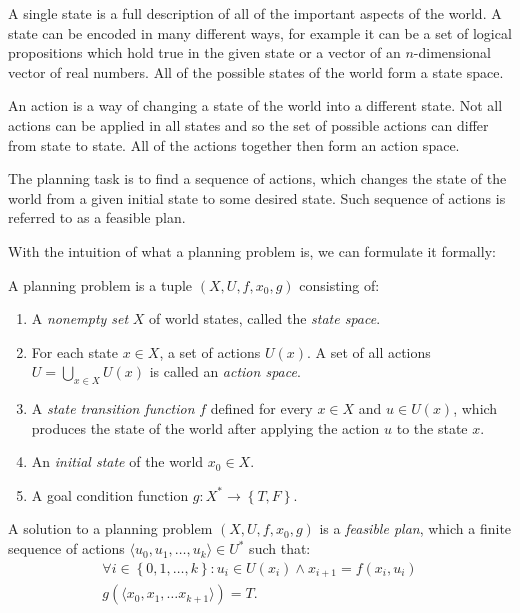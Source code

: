 A single state is a full description of all of the important aspects of the world. A state can be encoded in many different ways, for example it can be a set of logical propositions which hold true in the given state or a vector of an $n$-dimensional vector of real numbers. All of the possible states of the world form a state space.

An action is a way of changing a state of the world into a different state. Not all actions can be applied in all states and so the set of possible actions can differ from state to state. All of the actions together then form an action space.

The planning task is to find a sequence of actions, which changes the state of the world from a given initial state to some desired state. Such sequence of actions is referred to as a feasible plan.

With the intuition of what a planning problem is, we can formulate it formally:

\begin{defn}
	\label{def:basic_planning_problem}
	A planning problem is a tuple $\left(X, U, f, x_0, g\right)$ consisting of:
	
	\begin{enumerate}
		\item A \textit{nonempty set} $X$ of world states, called the \textit{state space}.
		\item For each state $x\in X$, a set of actions $U(x)$.  A set of all actions $U=\bigcup\limits_{x\in X} U(x)$ is called an \textit{action space}.
		\item A \textit{state transition function} $f$ defined for every $x\in X$ and $u\in U(x)$, which produces the state of the world after applying the action $u$ to the state $x$.
		\item An \textit{initial state} of the world $x_0\in X$.
		\item A goal condition function $g: X^* \rightarrow \left\{T,F\right\}$.
	\end{enumerate}
\end{defn}

\begin{defn}
	A solution to a planning problem $\left(X, U, f, x_0, g\right)$ is a \textit{feasible plan}, which a finite sequence of actions $\langle u_0, u_1, \ldots, u_k\rangle\in U^*$ such that:	
	\begin{gather*}
		\forall i \in \left\{0,1,\ldots,k\right\}: u_i\in U(x_i) \wedge x_{i+1}=f(x_i, u_i) \\
		g(\langle x_0, x_1, \ldots x_{k+1} \rangle)=T.
	\end{gather*}
\end{defn}

